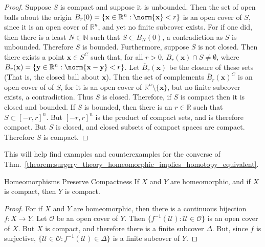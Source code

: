 \documentclass[crop=false,class=book,oneside]{standalone}
\begin{document}
            \begin{proof}
                Suppose $S$ is compact and
                suppose it is unbounded. Then the set of open
                balls about the origin
                $B_{r}(0)=\{\mathbf{x}\in\mathbb{R}^{n}:\norm{\mathbf{x}}<r\}$
                is an open cover of $S$, since it is an open
                cover of $\mathbb{R}^{n}$, and yet no
                finite subcover exists. For if one did, then there
                is a least $N\in\mathbb{N}$ such that
                $S\subset{B_{N}(0)}$, a contradiction as
                $S$ is unbounded. Therefore $S$ is bounded.
                Furthermore, suppose $S$ is
                not closed. Then there exists a point
                $\mathbf{x}\in{S^{C}}$ such that, for all
                $r>0$, $B_{r}(\mathbf{x})\cap{S}\ne\emptyset$,
                where
                $B_{r}(\mathbf{x})=\{\mathbf{y}\in\mathbb{R}^{n}:%
                 \norm{\mathbf{x}-\mathbf{y}}<r\}$.
                Let $\overline{B}_{r}(\mathbf{x})$ be the
                closure of these sets (That is, the closed ball
                about $\mathbf{x}$). Then the set of complements
                $\overline{B}_{r}(\mathbf{x})^{C}$ is an open
                cover of of $S$, for it is an open cover of
                $\mathbb{R}^{n}\setminus\{\mathbf{x}\}$, but no
                finite subcover exists, a contradiction. Thus $S$ is closed.
                Therefore, if $S$ is compact then it is closed and bounded.
                If $S$ is bounded, then there is an $r\in\mathbb{R}$
                such that $S\subset[-r,r]^{n}$. But
                $[-r,r]^{n}$ is the product of compact sets, and
                is therefore compact. But $S$ is closed, and closed
                subsets of compact spaces are compact. Therefore
                $S$ is compact.
            \end{proof}
            This will help find examples and counterexamples for the converse of
            Thm.~\ref{theorem:surgery_theory_homeomorphic_implies_homotopy_equivalent}.
            \begin{ltheorem}{Homeomorphisms Preserve Compactness}
                If $X$ and $Y$ are homeomorphic, and if
                $X$ is compact, then $Y$ is compact.
            \end{ltheorem}
            \begin{proof}
                For if $X$ and $Y$ are homeomorphic, then there
                is a continuous bijection $f:X\rightarrow{Y}$.
                Let $\mathcal{O}$ be an open cover of $Y$.
                Then $\{f^{-1}(\mathcal{U}):\mathcal{U}\in\mathcal{O}\}$
                is an open cover of $X$. But $X$ is compact, and
                therefore there is a finite subcover
                $\Delta$. But, since $f$ is surjective,
                $\{\mathcal{U}\in\mathcal{O}:f^{-1}(\mathcal{U})\in\Delta\}$
                is a finite subcover of $Y$.
            \end{proof}
\end{document}
